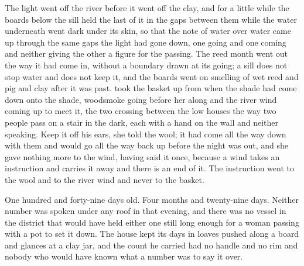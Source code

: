 The light went off the river before it went off the clay, and for a little while the boards below the sill held the last of it in the gaps between them while the water underneath went dark under its skin, so that the note of water over water came up through the same gaps the light had gone down, one going and one coming and neither giving the other a figure for the passing. The reed month went out the way it had come in, without a boundary drawn at its going; a sill does not stop water and does not keep it, and the boards went on smelling of wet reed and pig and clay after it was past.  took the basket up from  when the shade had come down onto the shade, woodsmoke going before her along  and the river wind coming up to meet it, the two crossing between the low houses the way two people pass on a stair in the dark, each with a hand on the wall and neither speaking. Keep it off his ears, she told the wool; it had come all the way down with them and would go all the way back up before the night was out, and she gave nothing more to the wind, having said it once, because a wind takes an instruction and carries it away and there is an end of it. The instruction went to the wool and to the river wind and never to the basket.

One hundred and forty-nine days old. Four months and twenty-nine days. Neither number was spoken under any roof in  that evening, and there was no vessel in the district that would have held either one still long enough for a woman passing with a pot to set it down. The house kept its days in loaves pushed along a board and glances at a clay jar, and the count he carried had no handle and no rim and nobody who would have known what a number was to say it over.

